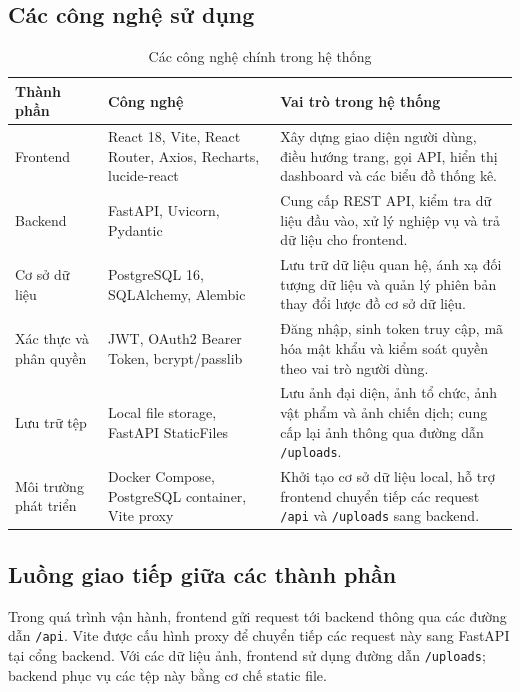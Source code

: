 \documentclass[12pt,a4paper]{report}
\begin{document}
\subsection{Các công nghệ sử dụng}

\begin{table}[H]
\centering
\caption{Các công nghệ chính trong hệ thống}
\label{tab:technology-architecture}
\begin{tabular}{|p{3.7cm}|p{5.5cm}|p{6cm}|}
\hline
\textbf{Thành phần} & \textbf{Công nghệ} & \textbf{Vai trò trong hệ thống} \\
\hline
Frontend &
React 18, Vite, React Router, Axios, Recharts, lucide-react &
Xây dựng giao diện người dùng, điều hướng trang, gọi API, hiển thị dashboard và các biểu đồ thống kê. \\
\hline
Backend &
FastAPI, Uvicorn, Pydantic &
Cung cấp REST API, kiểm tra dữ liệu đầu vào, xử lý nghiệp vụ và trả dữ liệu cho frontend. \\
\hline
Cơ sở dữ liệu &
PostgreSQL 16, SQLAlchemy, Alembic &
Lưu trữ dữ liệu quan hệ, ánh xạ đối tượng dữ liệu và quản lý phiên bản thay đổi lược đồ cơ sở dữ liệu. \\
\hline
Xác thực và phân quyền &
JWT, OAuth2 Bearer Token, bcrypt/passlib &
Đăng nhập, sinh token truy cập, mã hóa mật khẩu và kiểm soát quyền theo vai trò người dùng. \\
\hline
Lưu trữ tệp &
Local file storage, FastAPI StaticFiles &
Lưu ảnh đại diện, ảnh tổ chức, ảnh vật phẩm và ảnh chiến dịch; cung cấp lại ảnh thông qua đường dẫn \texttt{/uploads}. \\
\hline
Môi trường phát triển &
Docker Compose, PostgreSQL container, Vite proxy &
Khởi tạo cơ sở dữ liệu local, hỗ trợ frontend chuyển tiếp các request \texttt{/api} và \texttt{/uploads} sang backend. \\
\hline
\end{tabular}
\end{table}

\subsection{Luồng giao tiếp giữa các thành phần}

Trong quá trình vận hành, frontend gửi request tới backend thông qua các
đường dẫn \texttt{/api}. Vite được cấu hình proxy để chuyển tiếp các request này
sang FastAPI tại cổng backend. Với các dữ liệu ảnh, frontend sử dụng đường dẫn
\texttt{/uploads}; backend phục vụ các tệp này bằng cơ chế static file.
\end{document}
